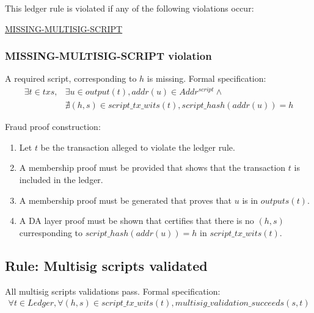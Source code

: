 \documentclass[../midgard.tex]{subfiles}
\begin{document}
This ledger rule is violated if any of the following violations occur:
\begin{itemize-multi}
  \item \hyperref[violation:MISSING-MULTISIG-SCRIPT]{MISSING-MULTISIG-SCRIPT}
\end{itemize-multi}

\subsubsection{MISSING-MULTISIG-SCRIPT violation}
\label{violation:MISSING-MULTISIG-SCRIPT}
A required script, corresponding to $h$ is missing.
Formal specification:
\begin{equation*}
\begin{split}
  \exists t \in txs, & \exists u \in output(t), addr(u) \in Addr^{script} \land \\
  & \nexists (h, s) \in script\_tx\_wits(t), script\_hash(addr(u)) = h
\end{split}
\end{equation*}

Fraud proof construction:
\begin{enumerate}
  \item Let $t$ be the transaction alleged to violate the ledger rule. 
  \item A membership proof must be provided that shows that the transaction $t$ is included in the ledger.
  \item A membership proof must be generated that proves that $u$ is in $outputs(t)$.
  \item A DA layer proof must be shown that certifies that there is no $(h, s)$ curresponding to \break
        $script\_hash(addr(u)) = h$ in $script\_tx\_wits(t)$.
\end{enumerate}

\subsection{Rule: Multisig scripts validated}
\label{rule:multisig-scripts-validated}

All multisig scripts validations pass.
Formal specification:
\begin{equation*}
\begin{split}
  \forall t \in Ledger, \forall (h, s) \in script\_tx\_wits(t), multisig\_validation\_succeeds(s, t)
\end{split}
\end{equation*}
\end{document}
